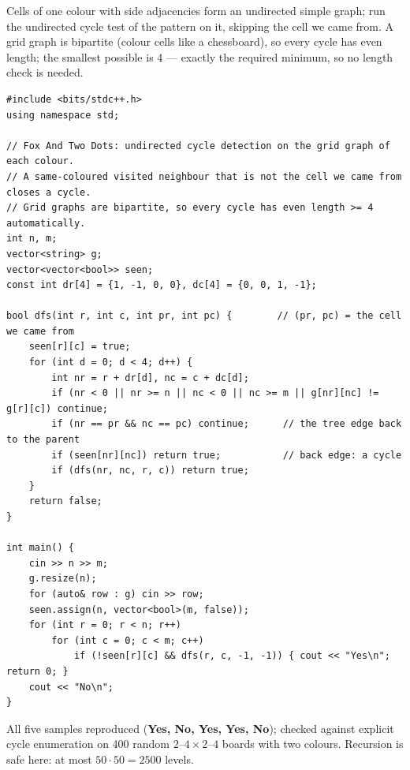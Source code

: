 \begin{solutionbox}
Cells of one colour with side adjacencies form an undirected simple graph; run the undirected cycle test of the pattern on it, skipping the cell we came from. A grid graph is bipartite (colour cells like a chessboard), so every cycle has even length; the smallest possible is 4 --- exactly the required minimum, so no length check is needed.
\begin{lstlisting}[style=cpp]
#include <bits/stdc++.h>
using namespace std;

// Fox And Two Dots: undirected cycle detection on the grid graph of each colour.
// A same-coloured visited neighbour that is not the cell we came from closes a cycle.
// Grid graphs are bipartite, so every cycle has even length >= 4 automatically.
int n, m;
vector<string> g;
vector<vector<bool>> seen;
const int dr[4] = {1, -1, 0, 0}, dc[4] = {0, 0, 1, -1};

bool dfs(int r, int c, int pr, int pc) {        // (pr, pc) = the cell we came from
    seen[r][c] = true;
    for (int d = 0; d < 4; d++) {
        int nr = r + dr[d], nc = c + dc[d];
        if (nr < 0 || nr >= n || nc < 0 || nc >= m || g[nr][nc] != g[r][c]) continue;
        if (nr == pr && nc == pc) continue;      // the tree edge back to the parent
        if (seen[nr][nc]) return true;           // back edge: a cycle
        if (dfs(nr, nc, r, c)) return true;
    }
    return false;
}

int main() {
    cin >> n >> m;
    g.resize(n);
    for (auto& row : g) cin >> row;
    seen.assign(n, vector<bool>(m, false));
    for (int r = 0; r < n; r++)
        for (int c = 0; c < m; c++)
            if (!seen[r][c] && dfs(r, c, -1, -1)) { cout << "Yes\n"; return 0; }
    cout << "No\n";
}
\end{lstlisting}
All five samples reproduced (\textbf{Yes, No, Yes, Yes, No}); checked against explicit cycle enumeration on 400 random $2$--$4 \times 2$--$4$ boards with two colours. Recursion is safe here: at most $50 \cdot 50 = 2500$ levels.
\end{solutionbox}

